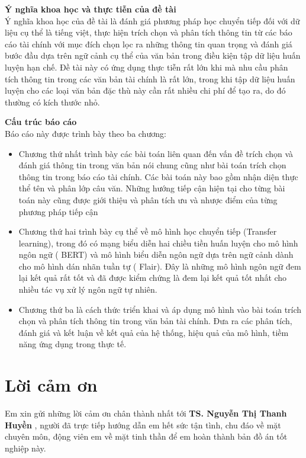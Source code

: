 \documentclass[14pt]{extreport}
\begin{document}
\textbf{Ý nghĩa khoa học và thực tiễn của đề tài}\\
Ý nghĩa khoa học của đề tài là đánh giá phương pháp học chuyển tiếp đối với dữ liệu cụ thể là tiếng việt, thực hiện trích chọn và phân tích thông tin từ các báo cáo tài chính với mục đích chọn lọc ra những thông tin quan trọng và đánh giá bước đầu dựa trên ngữ cảnh cụ thể của văn bản trong điều kiện tập dữ liệu huấn luyện hạn chế. Đề tài này có ứng dụng thực tiễn rất lớn khi mà nhu cầu phân tích thông tin trong các văn bản tài chính là rất lớn, trong khi tập dữ liệu huấn luyện cho các loại văn bản đặc thù này cần rất nhiều chi phí để tạo ra, do đó thường có kích thước nhỏ. 

\textbf{Cấu trúc báo cáo}\\
Báo cáo này được trình bày theo ba chương:
\begin{itemize}
    \item Chương thứ nhất trình bày các bài toán liên quan đến vấn đề trích chọn và đánh giá thông tin trong văn bản nói chung cũng như bài toán trích chọn thông tin trong báo cáo tài chính. Các bài toán này bao gồm nhận diện thực thể tên và phân lớp câu văn. Những hướng tiếp cận hiện tại cho từng bài toán này cũng được giới thiệu và phân tích ưu và nhược điểm của từng phương pháp tiếp cận
    \item Chương thứ hai trình bày cụ thể về mô hình học chuyển tiếp (Transfer learning), trong đó có mạng biểu diễn hai chiều tiền huấn luyện cho mô hình ngôn ngữ ( BERT) và mô hình biểu diễn ngôn ngữ dựa trên ngữ cảnh dành cho mô hình dán nhãn tuần tự ( Flair). Đây là những mô hình ngôn ngữ đem lại kết quả rất tốt và đã được kiểm chứng là đem lại kết quả tốt nhất cho nhiều tác vụ xử lý ngôn ngữ tự nhiên.
    \item Chương thứ ba là cách thức triển khai và áp dụng mô hình vào bài toán trích chọn và phân tích thông tin trong văn bản tài chính. Đưa ra các phân tích, đánh giá và kết luận về kết quả của hệ thống, hiệu quả của mô hình, tiềm năng ứng dụng trong thực tế.
\end{itemize}

\chapter*{Lời cảm ơn}
Em xin gửi những lời cảm ơn chân thành nhất tới \textbf{ TS. Nguyễn Thị Thanh Huyền} , người đã trực tiếp hướng dẫn em hết sức tận tình, chu đáo về mặt chuyên môn, động viên em về mặt tinh thần để em hoàn thành bản đồ án tốt nghiệp này.
\end{document}
